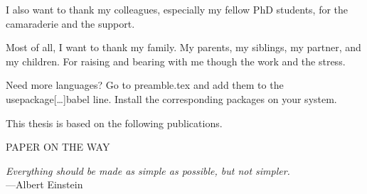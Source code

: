 \documentclass{book}
\begin{document}
I also want to thank my colleagues, especially my fellow PhD students, for the camaraderie and the support.

Most of all, I want to thank my family. My parents, my siblings, my partner, and my children. For raising and bearing with me though the work and the stress.

\newpage


Need more languages? Go to preamble.tex and add them to the
usepackage[\ldots]{babel} line. Install the corresponding packages on your
system.


This thesis is based on the following publications.

\begin{description}[leftmargin=!,labelwidth=0.7cm]
  \item[\I] 
  \item[\II] 
  \item[\III] 
  \item[\IV] 
  \item[\V] 
  \item[\VI] PAPER ON THE WAY
\end{description}



\mainmatter
\setcounter{table}{0}
\setcounter{page}{1}

\begin{flushright}
  \textit{Everything should be made as simple as possible, but not simpler.}\\
  {---Albert Einstein}
\end{flushright}
\end{document}
